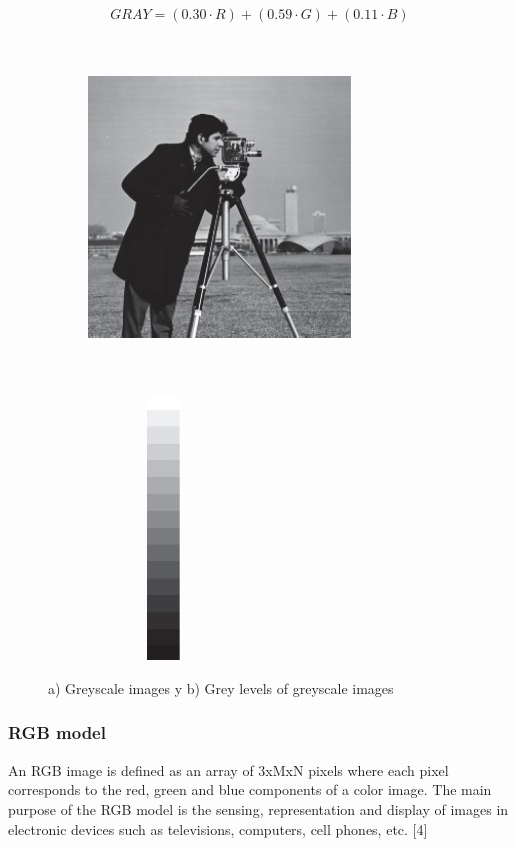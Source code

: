\begin{equation}
	GRAY = (0.30 \cdot R) + (0.59 \cdot G) + (0.11 \cdot B)
\end{equation}

\begin{figure}
	\begin{subfigure}{6cm}
		\centering    
    	\includegraphics[width=7cm,height=9cm,keepaspectratio]{images/ch2/grayScaleImage.jpg}
    \end{subfigure}
  	\begin{subfigure}{6cm}
  		\centering
  		\includegraphics[width=4cm,height=7cm,keepaspectratio]{images/ch2/grayLevelImage.jpg}
   
  	\end{subfigure}
  	\centering\caption{a) Greyscale images y b) Grey levels of greyscale images}
  	\label{fig:grayScaleImage}
\end{figure}

\subsubsection{RGB model}
An RGB image is defined as an array of 3xMxN pixels where each pixel corresponds to the red, green and blue components of a color image. The main purpose of the RGB model is the sensing, representation and display of images in electronic devices such as televisions, computers, cell phones, etc. [4]


